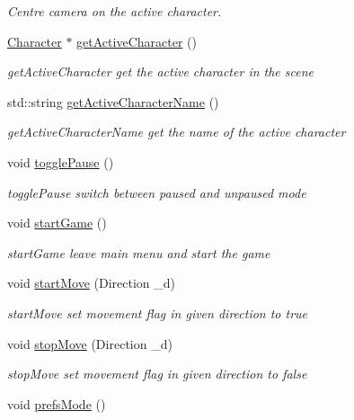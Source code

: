 \begin{DoxyCompactItemize}
\begin{DoxyCompactList}\small\item\em Centre camera on the active character. \end{DoxyCompactList}\item 
\hyperlink{class_character}{Character} $\ast$ \hyperlink{class_scene_aacea659211775a5183345fca5fe5538f}{get\+Active\+Character} ()
\begin{DoxyCompactList}\small\item\em get\+Active\+Character get the active character in the scene \end{DoxyCompactList}\item 
std\+::string \hyperlink{class_scene_aa67671db968512d32662be353cd3d712}{get\+Active\+Character\+Name} ()
\begin{DoxyCompactList}\small\item\em get\+Active\+Character\+Name get the name of the active character \end{DoxyCompactList}\item 
\hypertarget{class_scene_a42465f8df38eae566a70e6cbcbda5fb5}{}void \hyperlink{class_scene_a42465f8df38eae566a70e6cbcbda5fb5}{toggle\+Pause} ()\label{class_scene_a42465f8df38eae566a70e6cbcbda5fb5}

\begin{DoxyCompactList}\small\item\em toggle\+Pause switch between paused and unpaused mode \end{DoxyCompactList}\item 
\hypertarget{class_scene_a6073a008412ba841b4702c5164d54e56}{}void \hyperlink{class_scene_a6073a008412ba841b4702c5164d54e56}{start\+Game} ()\label{class_scene_a6073a008412ba841b4702c5164d54e56}

\begin{DoxyCompactList}\small\item\em start\+Game leave main menu and start the game \end{DoxyCompactList}\item 
void \hyperlink{class_scene_acaa15aad62df413e0db0a1a3975eabbc}{start\+Move} (Direction \+\_\+d)
\begin{DoxyCompactList}\small\item\em start\+Move set movement flag in given direction to true \end{DoxyCompactList}\item 
void \hyperlink{class_scene_a876e586bda5be0100e4be8accf5e17ff}{stop\+Move} (Direction \+\_\+d)
\begin{DoxyCompactList}\small\item\em stop\+Move set movement flag in given direction to false \end{DoxyCompactList}\item 
\hypertarget{class_scene_aea689152a0f2758c0304573e3f0696e0}{}void \hyperlink{class_scene_aea689152a0f2758c0304573e3f0696e0}{prefs\+Mode} ()\label{class_scene_aea689152a0f2758c0304573e3f0696e0}


\end{DoxyCompactItemize}
